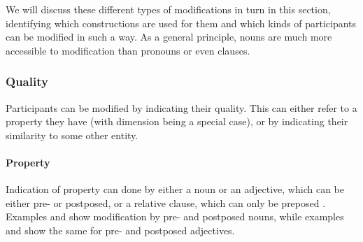 We will discuss these different types of modifications in turn in this section, identifying which constructions are used for them and which kinds of participants can be modified in such a way.  As a general principle, nouns are much more accessible to modification than pronouns or even clauses.


\subsubsection{Quality}\label{sec:func:Quality}
Participants can be modified by indicating their quality. This can either refer to a property they have (with dimension being a special case), or by indicating their similarity to some other entity.


\paragraph{Property}
Indication of property can done by either a noun or an adjective, which can be either pre- or postposed, or a relative clause, which can only be preposed . Examples  and  show modification by pre- and postposed nouns, while examples  and  show the same for pre- and postposed adjectives.





